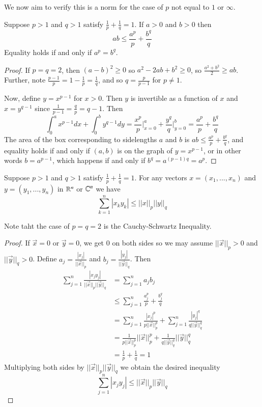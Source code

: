 We now aim to verify this is a norm for the case of $p$ not equal to $1$ or $\infty$.

\begin{lemma}
    Suppose $p > 1$ and $q > 1$ satisfy $\frac{1}{p} + \frac{1}{q} = 1$. If $a > 0$ and $b> 0$ then $$ab \leq \frac{a^p}{p} + \frac{b^q}{q}$$ Equality holds if and only if $a^p=b^q$.
\end{lemma}
\begin{proof}
    If $p = q = 2$, then $(a-b)^2 \geq 0$ so $a^2-2ab + b^2 \geq 0$, so $\frac{a^2+b^2}{2} \geq ab$. Further, note $\frac{p-1}{p} = 1-\frac{1}{p} = \frac{1}{q}$, and so $q = \frac{p}{p-1}$ for $p \neq 1$.

    Now, define $y = x^{p-1}$ for $x > 0$. Then $y$ is invertible as a function of $x$ and $x = y^{q-1}$ since $\frac{1}{p-1} = \frac{q}{p} = q-1$. Then $$\int_0^ax^{p-1}dx + \int_0^by^{q-1}dy = \frac{x^p}{p}\Big\rvert_{x=0}^a + \frac{y^q}{q}\Big\rvert_{y=0}^b = \frac{a^p}{p} + \frac{b^q}{q}$$ The area of the box corresponding to sidelengths $a$ and $b$ is $ab \leq \frac{a^p}{p}+\frac{b^q}{q}$, and equality holds if and only if $(a,b)$ is on the graph of $y=x^{p-1}$, or in other words $b = a^{p-1}$, which happens if and only if $b^q = a^{(p-1)q} = a^p$.
\end{proof}

\begin{lemma}
    Suppose $p > 1$ and $q > 1$ satisfy $\frac{1}{p} + \frac{1}{q} = 1$. For any vectors $x = (x_1,...,x_n)$ and $y = (y_1,...,y_n)$ in $\mathbb R^n$ or $\mathbb C^n$ we have $$\sum_{k=1}^n|x_ky_k| \leq ||x||_p||y||_q$$
\end{lemma}
Note taht the case of $p = q = 2$ is the Cauchy-Schwartz Inequality.

\begin{proof}
    If $\vec{x} = 0$ or $\vec{y} = 0$, we get $0$ on both sides so we may assume $||\vec{x}||_p > 0$ and $||\vec{y}||_q > 0$. Define $a_j = \frac{|x_j|}{||\vec{x}||_p}$ and $b_j = \frac{|y_j|}{||\vec{y}||_q}$. Then \begin{align*}
        \sum_{j=1}^n\frac{|x_jy_j|}{||\vec{x}||_p||\vec{y}||_q} &= \sum_{j=1}^na_jb_j \\
        &\leq \sum_{j=1}^n\frac{a_j^p}{p} +\frac{b_j^q}{q}\tag{by Young's Inequality} \\
        &= \sum_{j=1}^n\frac{|x_j|^p}{p||\vec{x}||_p^p} + \sum_{j=1}^n\frac{|y_j|^q}{q||\vec{y}||_q^q} \\
        &= \frac{1}{p||\vec{x}||_p^p}||\vec{x}||_p^p + \frac{1}{q||\vec{y}||_q^q}||\vec{y}||_q^q \\
        &= \frac{1}{p} + \frac{1}{q} = 1
    \end{align*}
    Multiplying both sides by $||\vec{x}||_p||\vec{y}||_q$ we obtain the desired inequality $$\sum_{j=1}^n|x_jy_j| \leq ||\vec{x}||_p||\vec{y}||_q$$
\end{proof}

